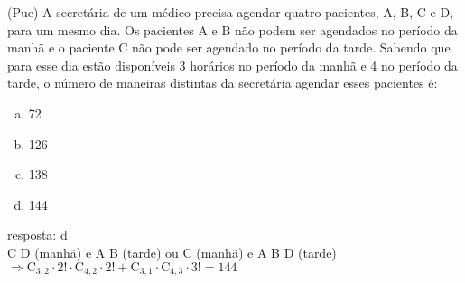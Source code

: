 \begin{ex}
  (Puc) A secretária de um médico precisa agendar quatro pacientes, A, B, C e D, para um mesmo dia. Os pacientes A e B não podem ser agendados no período da manhã e o paciente C não pode ser agendado no período da tarde. Sabendo que para esse dia estão disponíveis 3 horários no período da manhã e 4 no período da tarde, o número de maneiras distintas da secretária agendar esses pacientes é:
    \begin{enumerate} [(a)]
        \item 72
        \item 126
        \item 138
        \item 144
    \end{enumerate}
      \begin{sol}
      resposta: d \\
      C D (manhã) e A B (tarde) ou C (manhã) e A B D (tarde) \\
      $\Longrightarrow \mathrm{C}_{3,2}\cdot2!\cdot\mathrm{C}_{4,2}\cdot2!+\mathrm{C}_{3,1}\cdot\mathrm{C}_{4,3}\cdot3!=144$
      \end{sol}
 \end{ex}